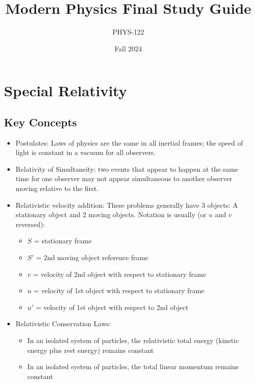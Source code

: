\documentclass{article}
\title{Modern Physics Final Study Guide}
\author{PHYS-122}
\date{Fall 2024}
\newcommand{\conceptbox}[1]{\begin{tcolorbox}[colback=blue!10] #1 \end{tcolorbox}}
\begin{document}
\maketitle

\newpage

\tableofcontents

\newpage

\section{Special Relativity}

\subsection{Key Concepts}
\conceptbox{
\begin{itemize}
    \item Postulates: Laws of physics are the same in all inertial frames; the speed of light is constant in a vacuum for all observers.
    \item Relativity of Simultaneity: two events that appear to happen at the same time for one observer may not appear simultaneous to another observer moving relative to the first.
    \item Relativistic velocity addition: These problems generally have 3 objects: A stationary object and 2 moving objects. Notation is usually (or $u$ and $v$ reversed):
    \begin{itemize}
        \item $S$ = stationary frame
        \item $S'$ = 2nd moving object reference frame
        \item $v$ = velocity of 2nd object with respect to stationary frame
        \item $u$ = velocity of 1st object with respect to stationary frame
        \item $u'$ = velocity of 1st object with respect to 2nd object
    \end{itemize}
    \item Relativistic Conservation Laws:
    \begin{itemize}
        \item In an isolated system of particles, the relativistic total energy (kinetic energy plus rest energy) remains constant
        \item In an isolated system of particles, the total linear momentum remains constant
    \end{itemize}
\end{itemize}
}
\end{document}
